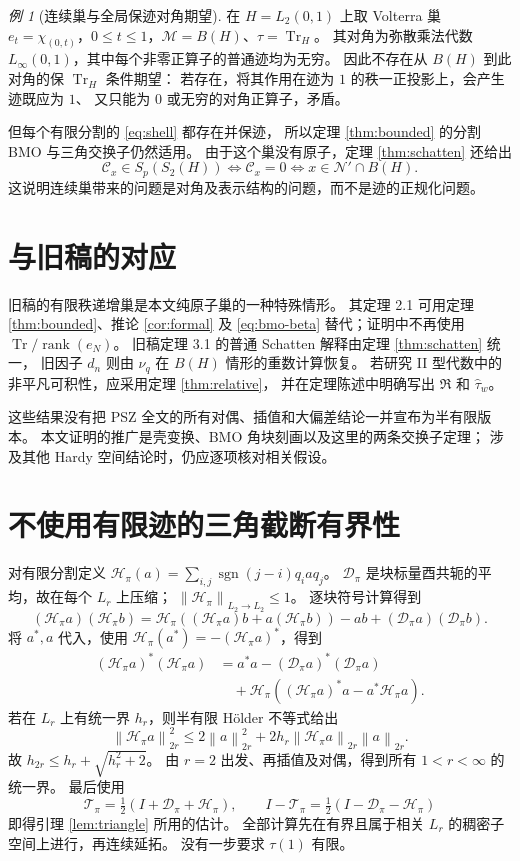 \documentclass[UTF8,11pt,a4paper,fontset=fandol]{ctexart}
\theoremstyle{remark}
\newtheorem{example}[theorem]{例}
\numberwithin{equation}{section}
\newcommand{\M}{\mathcal M}
\newcommand{\N}{\mathcal N}
\newcommand{\T}{\mathcal T}
\newcommand{\D}{\mathcal D}
\newcommand{\CC}{\mathcal C}
\newcommand{\Tr}{\operatorname{Tr}}
\newcommand{\norm}[1]{\left\lVert #1\right\rVert}
\DeclareMathOperator{\rank}{rank}
\begin{document}
\begin{example}[连续巢与全局保迹对角期望]
在 $H=L_2(0,1)$ 上取 Volterra 巢
$e_t=\chi_{(0,t)}$，$0\leq t\leq1$，$\M=B(H)$、$\tau=\Tr_H$。
其对角为弥散乘法代数 $L_\infty(0,1)$，其中每个非零正算子的普通迹均为无穷。
因此不存在从 $B(H)$ 到此对角的保 $\Tr_H$ 条件期望：
若存在，将其作用在迹为 $1$ 的秩一正投影上，会产生迹既应为 $1$、
又只能为 $0$ 或无穷的对角正算子，矛盾。

但每个有限分割的 \eqref{eq:shell} 都存在并保迹，
所以定理 \ref{thm:bounded} 的分割 BMO 与三角交换子仍然适用。
由于这个巢没有原子，定理 \ref{thm:schatten} 还给出
\[
 \CC_x\in S_p(S_2(H))
 \iff\CC_x=0
 \iff x\in\N'\cap B(H).
\]
这说明连续巢带来的问题是对角及表示结构的问题，而不是迹的正规化问题。
\end{example}

\section{与旧稿的对应}

旧稿的有限秩递增巢是本文纯原子巢的一种特殊情形。
其定理 2.1 可用定理 \ref{thm:bounded}、推论 \ref{cor:formal} 及
\eqref{eq:bmo-beta} 替代；证明中不再使用 $\Tr/\rank(e_N)$。
旧稿定理 3.1 的普通 Schatten 解释由定理 \ref{thm:schatten} 统一，
旧因子 $d_n$ 则由 $\nu_q$ 在 $B(H)$ 情形的重数计算恢复。
若研究 II 型代数中的非平凡可积性，应采用定理 \ref{thm:relative}，
并在定理陈述中明确写出 $\mathfrak R$ 和 $\widehat\tau_w$。

这些结果没有把 PSZ 全文的所有对偶、插值和大偏差结论一并宣布为半有限版本。
本文证明的推广是壳变换、BMO 角块刻画以及这里的两条交换子定理；
涉及其他 Hardy 空间结论时，仍应逐项核对相关假设。

\appendix
\section{不使用有限迹的三角截断有界性}

对有限分割定义
$\mathcal H_\pi(a)=\sum_{i,j}\operatorname{sgn}(j-i)q_i a q_j$。
$\D_\pi$ 是块标量酉共轭的平均，故在每个 $L_r$ 上压缩；
$\norm{\mathcal H_\pi}_{L_2\to L_2}\leq1$。
逐块符号计算得到
\[
 (\mathcal H_\pi a)(\mathcal H_\pi b)
 =\mathcal H_\pi((\mathcal H_\pi a)b+a(\mathcal H_\pi b))
  -ab+(\D_\pi a)(\D_\pi b).
\]
将 $a^*,a$ 代入，使用 $\mathcal H_\pi(a^*)=-(\mathcal H_\pi a)^*$，得到
\begin{align*}
 (\mathcal H_\pi a)^*(\mathcal H_\pi a)
 &=a^*a-(\D_\pi a)^*(\D_\pi a)\\
 &\quad+\mathcal H_\pi((\mathcal H_\pi a)^*a-a^*\mathcal H_\pi a).
\end{align*}
若在 $L_r$ 上有统一界 $h_r$，则半有限 H\"older 不等式给出
\[
 \norm{\mathcal H_\pi a}_{2r}^2
 \leq2\norm a_{2r}^2+2h_r\norm{\mathcal H_\pi a}_{2r}\norm a_{2r}.
\]
故 $h_{2r}\leq h_r+\sqrt{h_r^2+2}$。
由 $r=2$ 出发、再插值及对偶，得到所有 $1<r<\infty$ 的统一界。
最后使用
\[
 \T_\pi=\tfrac12(I+\D_\pi+\mathcal H_\pi),\qquad
 I-\T_\pi=\tfrac12(I-\D_\pi-\mathcal H_\pi)
\]
即得引理 \ref{lem:triangle} 所用的估计。
全部计算先在有界且属于相关 $L_r$ 的稠密子空间上进行，再连续延拓。
没有一步要求 $\tau(1)$ 有限。
\end{document}

